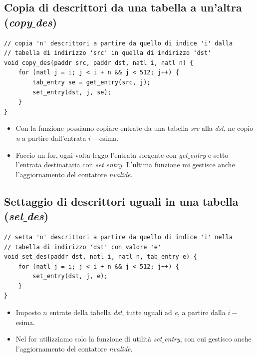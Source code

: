 \documentclass[11pt]{report}
\theoremstyle{definition}
\begin{document}
\subsection{Copia di descrittori da una tabella a un'altra (\emph{copy$\_$des})}
\small 
\begin{verbatim}
// copia 'n' descrittori a partire da quello di indice 'i' dalla
// tabella di indirizzo 'src' in quella di indirizzo 'dst'
void copy_des(paddr src, paddr dst, natl i, natl n) {
    for (natl j = i; j < i + n && j < 512; j++) {
        tab_entry se = get_entry(src, j);
        set_entry(dst, j, se);
    }
}
\end{verbatim}
\normalsize 
\begin{itemize}
	\item Con la funzione possiamo copiare entrate da una tabella \emph{src} alla \emph{dst}, ne copio \emph{n} a partire dall'entrata $i-$esima.
	\item Faccio un for, ogni volta leggo l'entrata sorgente con \emph{get$\_$entry} e setto l'entrata destinataria con \emph{set$\_$entry}. L'ultima funzione mi gestisce anche l'aggiornamento del contatore \emph{nvalide}.
\end{itemize}
\subsection{Settaggio di descrittori uguali in una tabella (\emph{set$\_$des})}
\small 
\begin{verbatim}
// setta 'n' descrittori a partire da quello di indice 'i' nella
// tabella di indirizzo 'dst' con valore 'e'
void set_des(paddr dst, natl i, natl n, tab_entry e) {
    for (natl j = i; j < i + n && j < 512; j++) {
        set_entry(dst, j, e);
    }
}
\end{verbatim}
\normalsize 
\begin{itemize}
	\item Imposto $n$ entrate della tabella \emph{dst}, tutte uguali ad \emph{e}, a partire dalla $i-$esima.
	\item Nel for utilizziamo solo la funzione di utilità \emph{set$\_$entry}, con cui gestisco anche l'aggiornamento del contatore \emph{nvalide}.
\end{itemize}
\clearpage 
\end{document}
